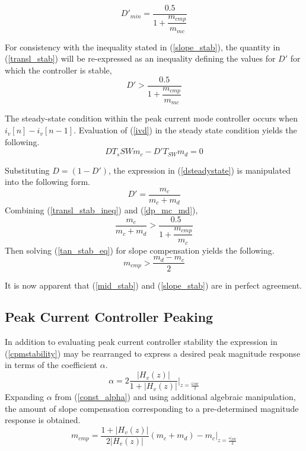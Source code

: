 \documentclass[conference]{IEEEtran}
\begin{document}
\begin{equation}
D'_{min} = \dfrac{0.5}{1 + \dfrac{m_{cmp}}{m_{mc}}} \label{transl_stab}
\end{equation}

For consistency with the inequality stated in (\ref{slope_stab}), the quantity in (\ref{transl_stab}) will be re-expressed as an inequality defining the values for $D'$ for which the controller is stable,
\begin{equation}
D' > \dfrac{0.5}{1 + \dfrac{m_{cmp}}{m_{mc}}} \label{transl_stab_ineq}
\end{equation}

The steady-state condition within the peak current mode controller occurs when $i_v[n] - i_v[n-1]$. Evaluation of (\ref{ivd}) in the steady state condition yields the following.
\begin{equation}
	D T_s{SW} m_c - D' T_{SW} m_d = 0 \label{dsteadystate}
\end{equation}

Substituting $D = (1-D')$, the expression in (\ref{dsteadystate}) is manipulated into the following form.
\begin{equation}
	D' = \dfrac{m_c}{m_c+m_d} \label{dp_mc_md}
\end{equation}
Combining (\ref{transl_stab_ineq}) and (\ref{dp_mc_md}),
\begin{equation}
	\dfrac{m_c}{m_c + m_d} > \dfrac{0.5}{1 + \dfrac{m_{cmp}}{m_c}} \label{tan_stab_eq}
\end{equation}
Then solving (\ref{tan_stab_eq}) for slope compensation yields the following.
\begin{equation}
	m_{cmp} > \dfrac{m_d - m_c}{2} \label{mid_stab}
\end{equation}

It is now apparent that (\ref{mid_stab}) and (\ref{slope_stab}) are in perfect agreement.

\subsection{Peak Current Controller Peaking}
In addition to evaluating peak current controller stability the expression in (\ref{cpmstability}) may be rearranged to express a desired peak magnitude response in terms of the coefficient $\alpha$.
\begin{equation}
	\alpha =  2 \frac{|H_v(z)|}{1 + |H_v(z)|} \bigg|_{z=\frac{\omega_{SW}}{2}} 
\end{equation}
Expanding $\alpha$ from (\ref{const_alpha}) and using additional algebraic manipulation, the amount of slope compensation corresponding to a pre-determined magnitude response is obtained.
\begin{equation}
	m_{cmp} = \frac{1 + |H_v(z)|}{2|H_v(z)|}(m_c + m_d) - m_c \bigg|_{z=\frac{\omega_{SW}}{2}}
\end{equation}
\end{document}
